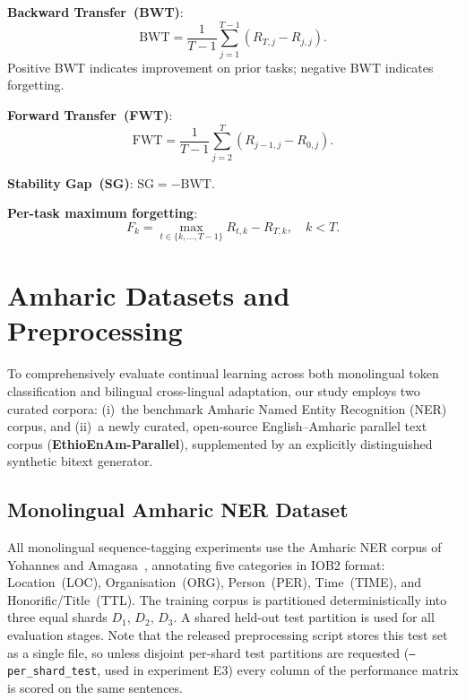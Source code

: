 \documentclass[11pt,a4paper]{article}
\begin{document}
\textbf{Backward Transfer~(BWT)}:
\begin{equation}
  \text{BWT} = \frac{1}{T-1}\sum_{j=1}^{T-1} \left( R_{T,j} - R_{j,j} \right).
  \label{eq:BWT}
\end{equation}
Positive BWT indicates improvement on prior tasks; negative BWT
indicates forgetting.

\textbf{Forward Transfer~(FWT)}:
\begin{equation}
  \text{FWT} = \frac{1}{T-1}\sum_{j=2}^{T} \left( R_{j-1,j} - R_{0,j} \right).
  \label{eq:FWT}
\end{equation}

\textbf{Stability Gap~(SG)}: $\text{SG} = -\text{BWT}$.

\textbf{Per-task maximum forgetting}:
\begin{equation}
  F_k = \max_{t \in \{k,\ldots,T-1\}} R_{t,k} - R_{T,k}, \quad k < T.
  \label{eq:Fk}
\end{equation}

\section{Amharic Datasets and Preprocessing}
\label{sec:datasets}

To comprehensively evaluate continual learning across both monolingual
token classification and bilingual cross-lingual adaptation, our study
employs two curated corpora: (i)~the benchmark Amharic Named Entity
Recognition (NER) corpus, and (ii)~a newly curated, open-source
English--Amharic parallel text corpus (\textbf{EthioEnAm-Parallel}),
supplemented by an explicitly distinguished synthetic bitext generator.

\subsection{Monolingual Amharic NER Dataset}
\label{sec:ner_dataset}

All monolingual sequence-tagging experiments use the Amharic NER corpus of
Yohannes and Amagasa~\cite{Yohannes2022}, annotating five
categories in IOB2 format: Location~(LOC), Organisation~(ORG),
Person~(PER), Time~(TIME), and Honorific/Title~(TTL).  The training
corpus is partitioned deterministically into three equal shards
$D_1$, $D_2$, $D_3$.  A shared held-out test partition is used for all
evaluation stages.  Note that the released preprocessing script stores
this test set as a single file, so unless disjoint per-shard test
partitions are requested (\texttt{--per\_shard\_test}, used in
experiment E3) every column of the performance matrix is scored on the
same sentences.
\end{document}
